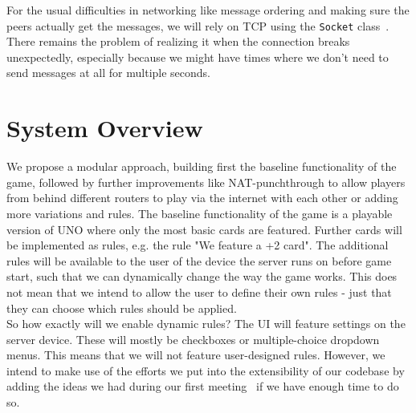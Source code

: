 \documentclass{report}
\begin{document}
For the usual difficulties in networking like message ordering and making sure the peers actually get the messages, we will rely on TCP using the \verb|Socket| class~\cite{socketdoc}. There remains the problem of realizing it when the connection breaks unexpectedly, especially because we might have times where we don't need to send messages at all for multiple seconds.


\section{System Overview}
We propose a modular approach, building first the baseline functionality of the game, followed by further improvements like NAT-punchthrough to allow players from behind different routers to play via the internet with each other or adding more variations and rules. The baseline functionality of the game is a playable version of UNO where only the most basic cards are featured. Further cards will be implemented as rules, e.g. the rule "We feature a +2 card". The additional rules will be available to the user of the device the server runs on before game start, such that we can dynamically change the way the game works. This does not mean that we intend to allow the user to define their own rules - just that they can choose which rules should be applied.\\
So how exactly will we enable dynamic rules? The UI will feature settings on the server device. These will mostly be checkboxes or multiple-choice dropdown menus. This means that we will not feature user-designed rules. However, we intend to make use of the efforts we put into the extensibility of our codebase by adding the ideas we had during our first meeting~\cite{firstprotocol} if we have enough time to do so.\\
\end{document}

